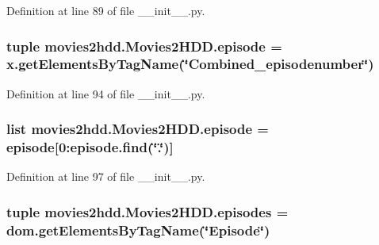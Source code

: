 Definition at line 89 of file \-\_\-\-\_\-init\-\_\-\-\_\-.\-py.

\hypertarget{classmovies2hdd_1_1_movies2_h_d_d_af69365988574fd1f1f66bfd372bd526c}{
\subsubsection[{episode}]{\setlength{\rightskip}{0pt plus 5cm}tuple movies2hdd.\-Movies2\-H\-D\-D.\-episode = x.\-get\-Elements\-By\-Tag\-Name(\char`\"{}Combined\-\_\-episodenumber\char`\"{})\hspace{0.3cm}{\ttfamily [static]}}}\label{classmovies2hdd_1_1_movies2_h_d_d_af69365988574fd1f1f66bfd372bd526c}


Definition at line 94 of file \-\_\-\-\_\-init\-\_\-\-\_\-.\-py.

\hypertarget{classmovies2hdd_1_1_movies2_h_d_d_ae6cedc0a37fc3d9c391cc0f6bcf872da}{
\subsubsection[{episode}]{\setlength{\rightskip}{0pt plus 5cm}list movies2hdd.\-Movies2\-H\-D\-D.\-episode = episode\mbox{[}0\-:episode.\-find(\char`\"{}.\char`\"{})\mbox{]}\hspace{0.3cm}{\ttfamily [static]}}}\label{classmovies2hdd_1_1_movies2_h_d_d_ae6cedc0a37fc3d9c391cc0f6bcf872da}


Definition at line 97 of file \-\_\-\-\_\-init\-\_\-\-\_\-.\-py.

\hypertarget{classmovies2hdd_1_1_movies2_h_d_d_adebd8de5fde82e9d8b512a03892442d1}{
\subsubsection[{episodes}]{\setlength{\rightskip}{0pt plus 5cm}tuple movies2hdd.\-Movies2\-H\-D\-D.\-episodes = dom.\-get\-Elements\-By\-Tag\-Name(\char`\"{}Episode\char`\"{})\hspace{0.3cm}{\ttfamily [static]}}}\label{classmovies2hdd_1_1_movies2_h_d_d_adebd8de5fde82e9d8b512a03892442d1}


